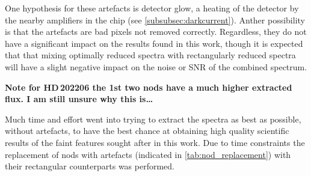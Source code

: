 One hypothesis for these artefacts is detector glow, a heating of the detector by the nearby amplifiers in the chip (see \cref{subsubsec:darkcurrent}).
Anther possibility is that the artefacts are bad pixels not removed correctly.
Regardless, they do not have a significant impact on the results found in this work, though it is expected that that mixing optimally reduced spectra with rectangularly reduced spectra will have a slight negative impact on the noise or SNR of the combined spectrum.

\textbf{Note for HD\,202206 the 1st two nods have a much higher extracted flux.
I am still unsure why this is\ldots{}}


Much time and effort went into trying to extract the spectra as best as possible, without artefacts, to have the best chance at obtaining high quality scientific results of the faint features sought after in this work.
Due to time constraints the replacement of nods with artefacts (indicated in \cref{tab:nod_replacement}) with their rectangular counterparts was performed.

